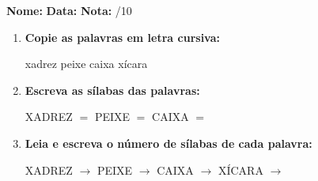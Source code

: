 \begin{exercicio}



\noindent\textbf{Nome:} \underline{\hspace{3.2cm}} \quad \textbf{Data:} \underline{\hspace{1.6cm}} \quad \textbf{Nota:} \underline{\hspace{0.9cm}}/10


\begin{enumerate}

  \item \textbf{Copie as palavras em letra cursiva:}
  \begin{center}
  xadrez \quad peixe \quad caixa \quad xícara
  \end{center}
  \begin{center}
  \underline{\hspace{2.4cm}} \quad \underline{\hspace{2.4cm}} \quad \underline{\hspace{2.4cm}} \quad \underline{\hspace{2.4cm}}
  \end{center}

  \item \textbf{Escreva as sílabas das palavras:}
  \begin{center}
  XADREZ $=$ \underline{\hspace{1.5cm}} \underline{\hspace{1.5cm}} \quad PEIXE $=$ \underline{\hspace{1.5cm}} \underline{\hspace{1.5cm}} \quad CAIXA $=$ \underline{\hspace{1.5cm}} \underline{\hspace{1.5cm}}
  \end{center}

  \item \textbf{Leia e escreva o número de sílabas de cada palavra:}
  \begin{center}
  XADREZ $\rightarrow$ \underline{\hspace{0.9cm}} \quad PEIXE $\rightarrow$ \underline{\hspace{0.9cm}} \quad CAIXA $\rightarrow$ \underline{\hspace{0.9cm}} \quad XÍCARA $\rightarrow$ \underline{\hspace{0.9cm}}
  \end{center}


\end{enumerate}
\end{exercicio}
